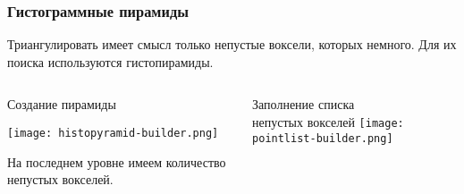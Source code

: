 \begin{frame}
  \frametitle{Гистограммные пирамиды}

  \begin{block}{}
    Триангулировать имеет смысл только непустые воксели, которых немного. Для их поиска используются гистопирамиды.
  \end{block}

  \begin{columns}[onlytextwidth]
    \begin{column}{.55\textwidth}
      \begin{block}{Создание пирамиды}
        \begin{center}
          \texttt{[image: histopyramid-builder.png]}
        \end{center}
        На последнем уровне имеем количество непустых вокселей.
      \end{block}
    \end{column}
    \begin{column}{.35\textwidth}
      \begin{block}{Заполнение списка \\ непустых вокселей}
        \centering
        \texttt{[image: pointlist-builder.png]}
      \end{block}
    \end{column}
  \end{columns}
\end{frame}

